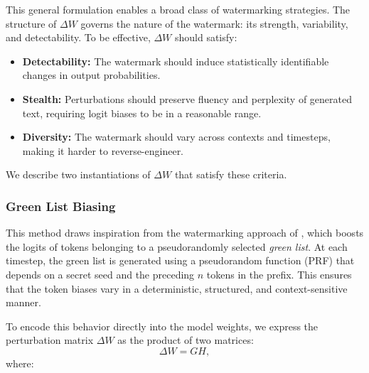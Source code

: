 This general formulation enables a broad class of watermarking strategies. The structure of \( \Delta W \) governs the nature of the watermark: its strength, variability, and detectability. To be effective, \( \Delta W \) should satisfy:
\begin{itemize}
    \item \textbf{Detectability:} The watermark should induce statistically identifiable changes in output probabilities.
    \item \textbf{Stealth:} Perturbations should preserve fluency and perplexity of generated text, requiring logit biases to be in a reasonable range.
    \item \textbf{Diversity:} The watermark should vary across contexts and timesteps, making it harder to reverse-engineer.
\end{itemize}
We describe two instantiations of \( \Delta W \) that satisfy these criteria.

\subsubsection{Green List Biasing}

This method draws inspiration from the watermarking approach of \citet{kirchenbauer2023watermark}, which boosts the logits of tokens belonging to a pseudorandomly selected \emph{green list}. At each timestep, the green list is generated using a pseudorandom function (PRF) that depends on a secret seed and the preceding \( n \) tokens in the prefix. This ensures that the token biases vary in a deterministic, structured, and context-sensitive manner.

To encode this behavior directly into the model weights, we express the perturbation matrix \( \Delta W \) as the product of two matrices:
\begin{equation}
    \Delta W = G H,
\end{equation}
where:


